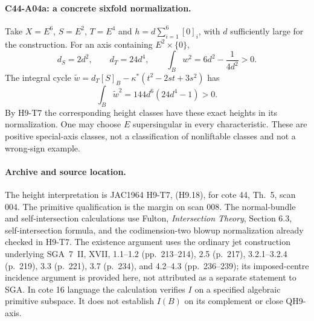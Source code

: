 \paragraph{C44-A04a: a concrete sixfold normalization.}
Take $X=E^6$, $S=E^2$, $T=E^4$ and
$h=d\sum_{i=1}^{6}[0]_i$, with $d$ sufficiently large for the
construction. For an axis containing $E^2\times\{0\}$,
\[
 d_S=2d^2,\qquad d_T=24d^4,\qquad
 \int_Bw^2=6d^2-\frac1{4d^2}>0.
\]
The integral cycle $\widetilde w=d_T[S]_B-
\kappa^*(t^2-2st+3s^2)$ has
\[
        \int_B\widetilde w^2=144d^6(24d^4-1)>0.
\]
By H9-T7 the corresponding height classes have these exact heights
in its normalization. One may choose $E$ supersingular in every
characteristic. These are positive special-axis classes, not a
classification of nonliftable classes and not a wrong-sign example.

\paragraph{Archive and source location.}
The height interpretation is JAC1964 H9-T7, (H9.18), for cote 44,
Th.~5, scan 004. The primitive qualification is the margin on scan
008. The normal-bundle and self-intersection calculations use Fulton,
\emph{Intersection Theory}, Section 6.3, self-intersection formula,
and the codimension-two blowup normalization already checked in
H9-T7. The existence argument uses the ordinary jet construction
underlying SGA~7~II, XVII, 1.1--1.2 (pp.~213--214), 2.5
(p.~217), 3.2.1--3.2.4 (p.~219), 3.3 (p.~221), 3.7
(p.~234), and 4.2--4.3 (pp.~236--239); its imposed-centre
incidence argument is provided here, not attributed as a separate
statement to SGA. In cote 16 language the calculation verifies $I$
on a specified algebraic primitive subspace. It does not establish
$I(B)$ on its complement or close QH9-axis.
